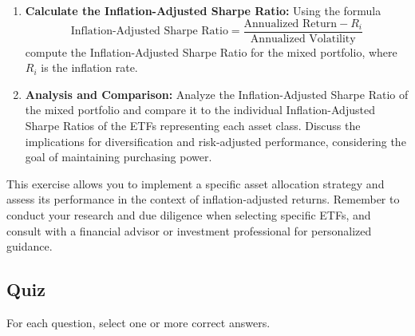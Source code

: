 \documentclass{article}
\begin{document}
\begin{enumerate}
    \item \textbf{Calculate the Inflation-Adjusted Sharpe Ratio:} Using the formula
    \begin{equation}
        \text{Inflation-Adjusted Sharpe Ratio} = \frac{\text{Annualized Return} - R_i}{\text{Annualized Volatility}}
    \end{equation}
    compute the Inflation-Adjusted Sharpe Ratio for the mixed portfolio, where \(R_i\) is the inflation rate.
    
    \item \textbf{Analysis and Comparison:} Analyze the Inflation-Adjusted Sharpe Ratio of the mixed portfolio and compare it to the individual Inflation-Adjusted Sharpe Ratios of the ETFs representing each asset class. Discuss the implications for diversification and risk-adjusted performance, considering the goal of maintaining purchasing power.
\end{enumerate}

This exercise allows you to implement a specific asset allocation strategy and assess its performance in the context of inflation-adjusted returns. Remember to conduct your research and due diligence when selecting specific ETFs, and consult with a financial advisor or investment professional for personalized guidance.

\subsection{Quiz}
For each question, select one or more correct answers.
\end{document}
